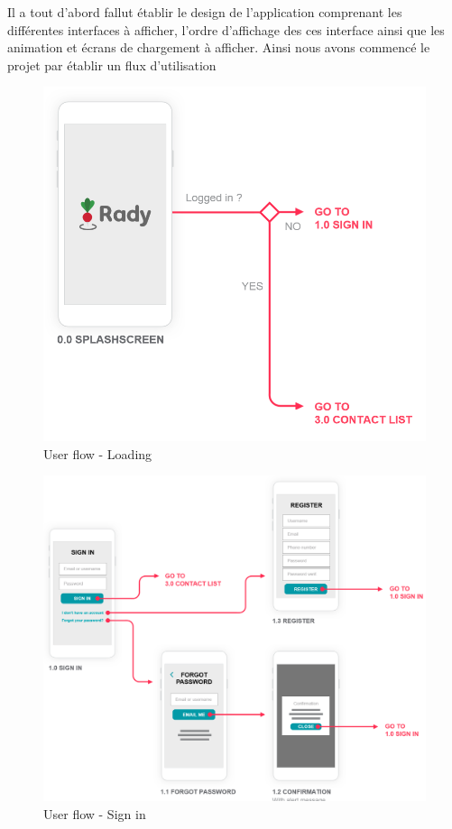 \documentclass[french]{article}
\begin{document}
	Il a tout d'abord fallut établir le design de l'application comprenant les différentes interfaces à afficher, l'ordre d'affichage des ces interface ainsi que les animation et écrans de chargement à afficher. Ainsi nous avons commencé le projet par établir un flux d'utilisation
	
	\begin{figure}[H]
		\centering
		\includegraphics[scale=0.6]{../user-flow/user-flow-1.png}
		\caption{User flow - Loading}
		\label{User flow - Loading}
	\end{figure}
	
	\begin{figure}[H]
		\centering
		\includegraphics[scale=0.6]{../user-flow/user-flow-2.png}
		\caption{User flow - Sign in}
		\label{User flow - Sign in}
	\end{figure}
	
\end{document}
